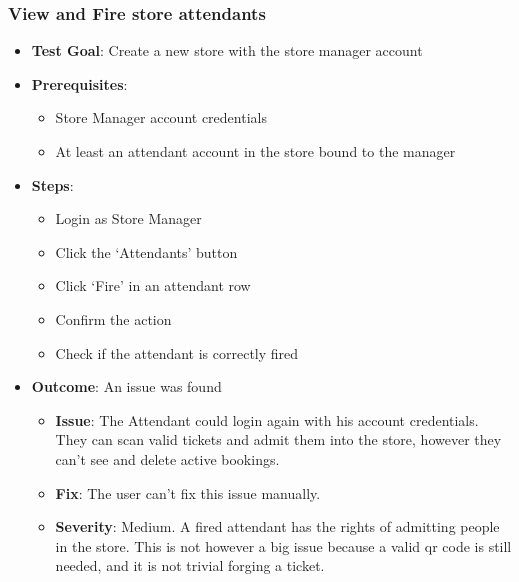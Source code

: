 \subsubsection{View and Fire store attendants}
\begin{itemize}
    \item \textbf{Test Goal}: Create a new store with the store manager account
    \item \textbf{Prerequisites}:
          \begin{itemize}
              \item Store Manager account credentials
              \item At least an attendant account in the store bound to the manager
          \end{itemize}
    \item \textbf{Steps}:
          \begin{itemize}
              \item Login as Store Manager
              \item Click the `Attendants' button
              \item Click `Fire' in an attendant row
              \item Confirm the action
              \item Check if the attendant is correctly fired
          \end{itemize}
    \item \textbf{Outcome}:  An issue was found
          \begin{itemize}
              \item \textbf{Issue}: The Attendant could login again with his account credentials. They can scan valid tickets and admit them into the store, however they can't see and
                    delete active bookings.
              \item \textbf{Fix}: The user can't fix this issue manually.
              \item \textbf{Severity}: Medium. A fired attendant has the rights of admitting people in the store. This is not however a big issue because a valid qr code is still needed, and it is not trivial forging a ticket.
          \end{itemize}
\end{itemize}